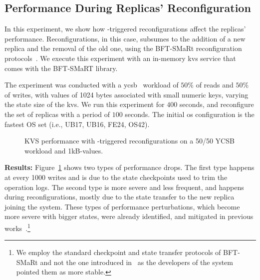 \subsection{Performance During Replicas' Reconfiguration}
\label{sec:reconfiguration}



In this experiment, we show how \system-triggered reconfigurations affect the replicas' performance.
Reconfigurations, in this case, subsumes to the addition of a new replica and the removal of the old one, using the BFT-SMaRt reconfiguration protocols~\cite{Bessani:2014}. 
We execute this experiment with an in-memory \gls{kvs} service that comes with the BFT-SMaRT library.

The experiment was conducted with a \gls{ycsb}~\cite{Cooper:2010} workload of $50\%$ of reads and $50\%$ of writes, with values of 1024 bytes associated with small numeric keys, varying the state size of the \gls{kvs}.
We run this experiment for $400$ seconds, and reconfigure the set of replicas with a period of $100$ seconds. 
The initial \gls{os} configuration is the fastest OS set (i.e., UB17, UB16, FE24, OS42).
\begin{figure}[h]

\caption{KVS performance with \system-triggered reconfigurations on a 50/50 YCSB workload and 1kB-values.}
\label{fig:reconfiguration}
\end{figure}



\textbf{Results:}
Figure~\ref{fig:reconfiguration} shows two types of performance drops.
The first type happens at every 1000 writes and is due to the state checkpoints used to trim the operation logs.
The second type is more severe and less frequent, and happens during reconfigurations, mostly due to the state transfer to the new replica joining the system.
These types of performance perturbations, which become more severe with bigger states, were already identified, and mitigated in previous works~\cite{Bessani:2013}.\footnote{We employ the standard checkpoint and state transfer protocols of BFT-SMaRt and not the one introduced in~\cite{Bessani:2013} as the developers of the system pointed them as more stable.} 

